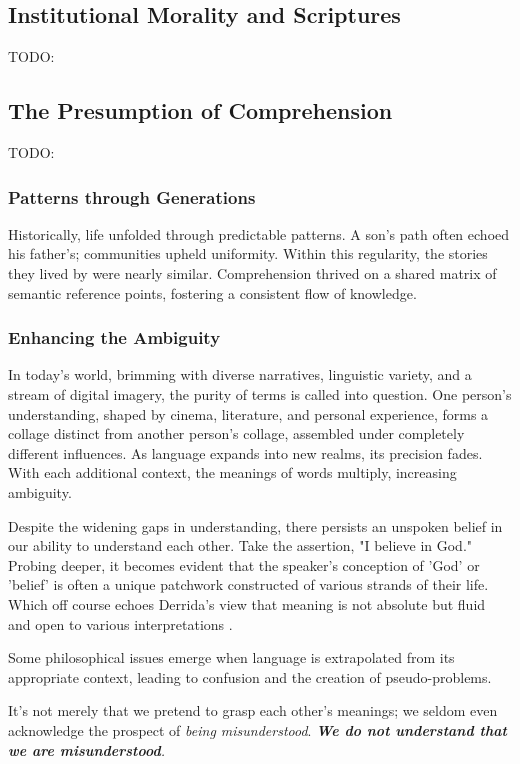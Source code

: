 \documentclass[12pt,a4]{article}
\begin{document}
    \subsection{Institutional Morality and Scriptures}
    TODO:
    
    \subsection{The Presumption of Comprehension}
    TODO:

    \subsubsection{Patterns through Generations}
        \par
        Historically, life unfolded through predictable patterns. A son's path often echoed his father's; communities upheld uniformity. Within this regularity, the stories they lived by were nearly similar. Comprehension thrived on a shared matrix of semantic reference points, fostering a consistent flow of knowledge.
        
    \subsubsection{Enhancing the Ambiguity}
        
        In today's world, brimming with diverse narratives, linguistic variety, and a stream of digital imagery, the purity of terms is called into question. One person's understanding, shaped by cinema, literature, and personal experience, forms a collage distinct from another person's collage, assembled under completely different influences. 
        As language expands into new realms, its precision fades. With each additional context, the meanings of words multiply, increasing ambiguity.
        \par
        Despite the widening gaps in understanding, there persists an unspoken belief in our ability to understand each other. Take the assertion, "I believe in God." Probing deeper, it becomes evident that the speaker's conception of 'God' or 'belief' is often a unique patchwork constructed of various strands of their life.
        Which off course echoes Derrida's view that meaning is not absolute but fluid and open to various interpretations \cite{Deconstruction}. 
        \par
        Some philosophical issues emerge when language is extrapolated from its appropriate context, leading to confusion and the creation of pseudo-problems. 
        \par
        It's not merely that we pretend to grasp each other's meanings; we seldom even acknowledge the prospect of \textit{being misunderstood}. \textit{\textbf{We do not understand that we are misunderstood}}\textit{.}
        
\end{document}
